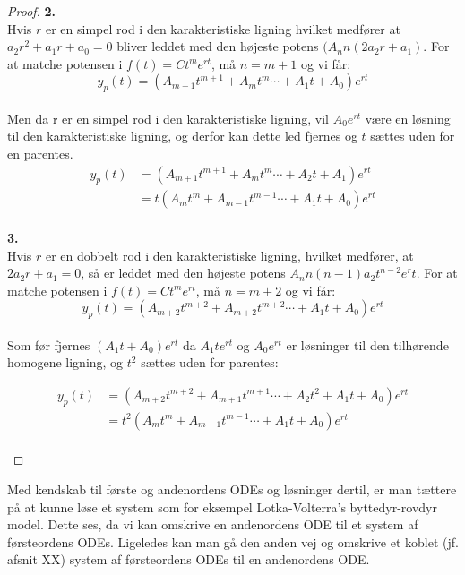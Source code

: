 \begin{proof}
\textbf{2.} \\
Hvis $r$ er en simpel rod i den karakteristiske ligning hvilket medfører at $a_2r^2+a_1r+a_0=0$ bliver leddet med den højeste potens $(A_nn(2a_2r+a_1)$. For at matche potensen i $f(t)=Ct^me^{rt}$, må $n=m+1$ og vi får: \\
\begin{equation*}
y_p(t)= (A_{m+1}t^{m+1}+A_{m}t^{m}  \cdots +A_1t+A_0)e^{rt}
\end{equation*} \\
Men da r  er en simpel rod i den karakteristiske ligning, vil $A_0e^{rt}$ være  en løsning til den karakteristiske ligning, og derfor kan dette led fjernes og $t$ sættes uden for en parentes. \\
\begin{align*}
y_p(t)&= (A_{m+1}t^{m+1}+A_{m}t^{m}  \cdots+ A_2t +A_1)e^{rt} \\
      &= t(A_{m}t^{m}+A_{m-1}t^{m-1}  \cdots +A_1t+A_0)e^{rt}
\end{align*} \\

\textbf{3.}\\
Hvis $r$ er en dobbelt rod i den karakteristiske ligning, hvilket medfører, at $2a_2r+a_1=0$, så er leddet med den højeste potens $A_nn(n-1)a_2t^{n-2}e^rt$. For at matche potensen i $f(t)=Ct^me^{rt}$, må $n=m+2$ og vi får: \\

\begin{equation*}
y_p(t)= (A_{m+2}t^{m+2}+A_{m+2}t^{m+2}  \cdots +A_1t+A_0)e^{rt}
\end{equation*} \\
Som før fjernes $(A_1t+A_0)e^{rt}$ da $A_1te^{rt}$ og $A_0e^{rt}$ er løsninger til den tilhørende homogene ligning, og $t^2$ sættes uden for parentes: 

\begin{align*}
y_p(t)&= (A_{m+2}t^{m+2}+A_{m+1}t^{m+1}  \cdots+ A_2t^2+A_1t+A_0)e^{rt} \\
      &= t^2(A_{m}t^{m}+A_{m-1}t^{m-1}  \cdots +A_1t+A_0)e^{rt}
\end{align*} \\

\end{proof}

Med kendskab til første og andenordens ODEs og løsninger dertil, er man tættere på at kunne løse et system som for eksempel Lotka-Volterra's byttedyr-rovdyr model. Dette ses, da vi kan omskrive en andenordens ODE til et system af førsteordens ODEs. Ligeledes kan man gå den anden vej og omskrive et koblet (jf. afsnit XX) system af førsteordens ODEs til en andenordens ODE.

